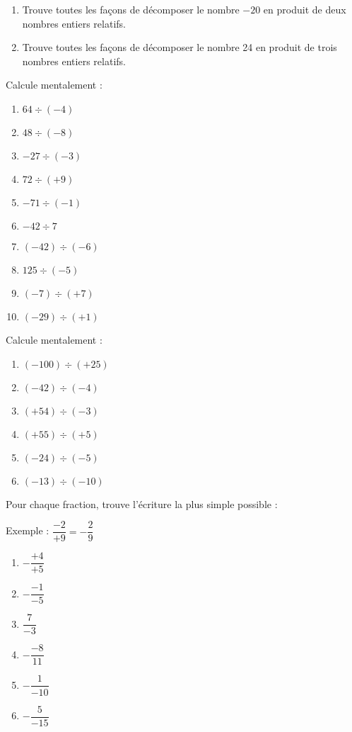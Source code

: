 \begin{exercice}[Décompositions...]
\begin{enumerate}
\item Trouve toutes les façons de décomposer le nombre $-20$ en produit de deux nombres entiers relatifs.
\item Trouve toutes les façons de décomposer le nombre 24 en produit de trois nombres entiers relatifs.
\end{enumerate}
\end{exercice} 






\begin{exercice}Calcule mentalement :
\begin{enumerate}
\item $64 \div (-4)$
\item $48 \div (-8)$
\item $-27 \div (-3)$
\item $72 \div (+9)$
\item $-71 \div ( -1)$
\item $-42 \div 7$
\item $(-42) \div (-6)$
\item $125 \div (-5)$
\item $(-7) \div (+7)$
\item $(-29) \div (+1)$
\end{enumerate}
\end{exercice}



\begin{exercice}Calcule mentalement :
\begin{enumerate}
\item $(-100) \div (+25)$
\item $(-42) \div (-4)$
\item $(+54) \div (-3)$
\item $(+55) \div (+5)$
\item $(-24) \div (-5)$
\item $(-13) \div (-10)$
\end{enumerate}
\end{exercice}


\begin{exercice}Pour chaque fraction, trouve l'écriture la plus simple possible : 

Exemple : $\dfrac{-2}{+9}=-\dfrac{2}{9}$
\begin{enumerate}
\item $-\dfrac{+4}{+5}$
\item $-\dfrac{-1}{-5}$
\item $\dfrac{7}{-3}$
\item $-\dfrac{-8}{11}$
\item $-\dfrac{1}{-10}$
\item $-\dfrac{5}{-15}$
\end{enumerate}
\end{exercice}



